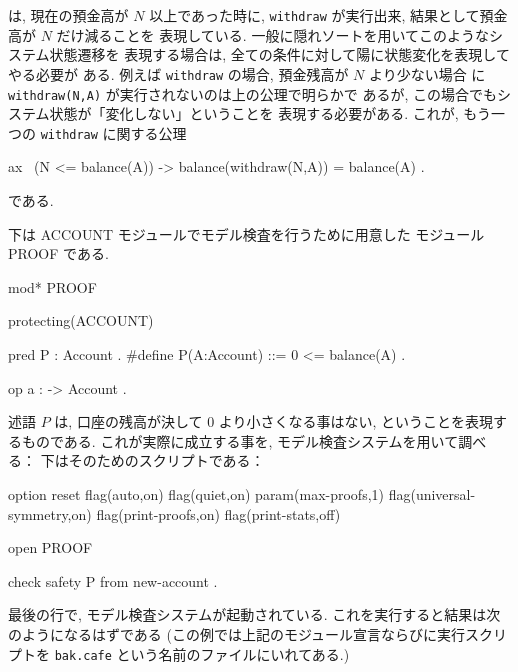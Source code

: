 は, 現在の預金高が $N$ 以上であった時に,
\texttt{withdraw} が実行出来, 結果として預金高が $N$ だけ減ることを
表現している. 一般に隠れソートを用いてこのようなシステム状態遷移を
表現する場合は, 全ての条件に対して陽に状態変化を表現してやる必要が
ある. 例えば \texttt{withdraw} の場合, 預金残高が $N$ より少ない場合
に \texttt{withdraw(N,A)} が実行されないのは上の公理で明らかで
あるが, この場合でもシステム状態が「変化しない」ということを
表現する必要がある. これが, もう一つの \texttt{withdraw} に関する公理

\begin{vvtm}
\begin{simplev}
  ax ~(N <= balance(A)) -> balance(withdraw(N,A)) = balance(A) .
\end{simplev}
\end{vvtm}

である.

下は ACCOUNT モジュールでモデル検査を行うために用意した
モジュール PROOF である.

\begin{vvtm}
\begin{simplev}
mod* PROOF {
  protecting(ACCOUNT)

  pred P : Account .
  #define P(A:Account) ::= 0 <= balance(A) .

  op a : -> Account .
}
\end{simplev}
\end{vvtm}

述語 $P$ は, 口座の残高が決して 0 より小さくなる事はない,
ということを表現するものである.
これが実際に成立する事を, モデル検査システムを用いて調べる：
下はそのためのスクリプトである：

\begin{vvtm}
\begin{simplev}
option reset
flag(auto,on)
flag(quiet,on)
param(max-proofs,1)
flag(universal-symmetry,on)
flag(print-proofs,on)
flag(print-stats,off)

open PROOF

check safety P from new-account .
\end{simplev}
\end{vvtm}

最後の行で, モデル検査システムが起動されている. 
これを実行すると結果は次のようになるはずである
(この例では上記のモジュール宣言ならびに実行スクリプトを
\texttt{bak.cafe} という名前のファイルにいれてある.)

